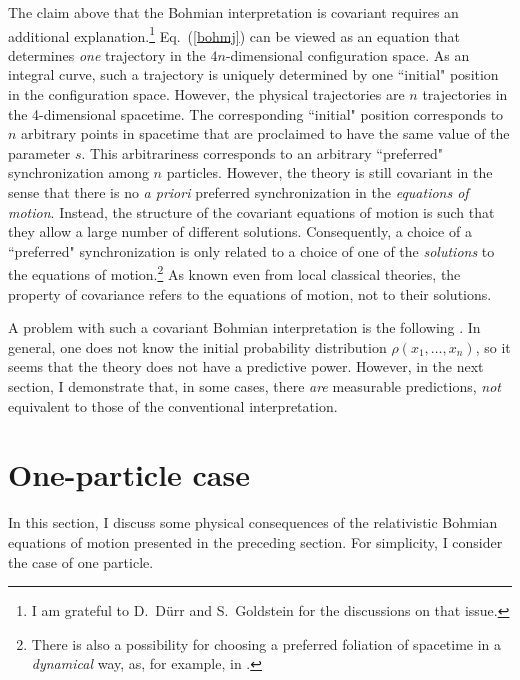 \documentclass[10pt,twoside]{aipproc} %
\begin{document}
The claim above that the Bohmian interpretation is covariant
requires an additional explanation.\footnote{I am 
grateful to D.~D\"urr and
S.~Goldstein for the discussions on that issue.}
Eq.~(\ref{bohmj}) can be viewed as an equation that determines 
{\em one} trajectory in the $4n$-dimensional configuration space. As an 
integral curve, such a trajectory is uniquely determined 
by one ``initial" position in the configuration space.
However, the physical trajectories are $n$ trajectories
in the 4-dimensional spacetime. The corresponding ``initial"
position corresponds to $n$ arbitrary points in spacetime 
that are proclaimed to have the same 
value of the parameter $s$. This arbitrariness corresponds 
to an arbitrary ``preferred" synchronization among $n$ particles.   
However, the theory is still 
covariant in the sense that there is no {\it a priori} 
preferred synchronization in the {\em equations of motion}. 
Instead, the structure of the covariant equations of motion 
is such that they allow a large number of different solutions.
Consequently, a choice of a ``preferred" synchronization
is only related to a choice of one of the {\em solutions}
to the equations of motion.\footnote{There is also a possibility 
for choosing a preferred foliation of spacetime in a 
{\em dynamical} way, as, for example, in \cite{durr99,nikolepjc}.} 
As known even from local classical theories,
the property of covariance refers to the equations of motion,
not to their solutions. 

A problem with such a covariant Bohmian interpretation 
is the following \cite{bern}.
In general, one does not know the initial probability 
distribution $\rho(x_1,\ldots ,x_n)$, so it seems that the theory 
does not have a predictive power. However,
in the next section, I demonstrate that, in some cases, there {\em are} 
measurable predictions, {\em not} equivalent to those of the conventional 
interpretation. 


\section{One-particle case}

In this section, I discuss some physical consequences of the 
relativistic Bohmian equations of motion presented in the 
preceding section.
For simplicity, I consider the case of one particle.
\end{document}
